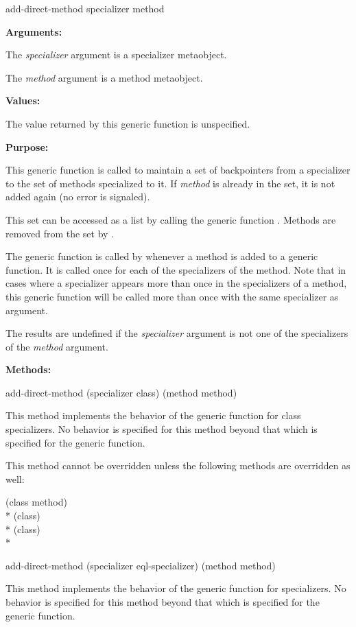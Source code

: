 \begin{defun}
add-direct-method specializer method

\textbf{Arguments:}

The \emph{specializer} argument is a specializer metaobject.

The \emph{method} argument is a method metaobject.

\textbf{Values:}

The value returned by this generic function is unspecified.

\textbf{Purpose:}

This generic function is called to maintain a set of backpointers from a
specializer to the set of methods specialized to it. If \emph{method} is already in the
set, it is not added again (no error is signaled).

This set can be accessed as a list by calling the generic function
. Methods are removed from the set by
.

The generic function  is called by  whenever a method
is added to a generic function. It is called once for each of the specializers
of the method. Note that in cases where a specializer appears more than once in
the specializers of a method, this generic function will be called more than
once with the same specializer as argument. 

The results are undefined if the \emph{specializer} argument is not one of the
specializers of the \emph{method} argument.

\textbf{Methods:}

\begin{defun}
add-direct-method (specializer class) (method method)

This method implements the behavior of the generic function for class
specializers. No behavior is specified for this method beyond that which is
specified for the generic function.

This method cannot be overridden unless the following methods are overridden as well:

\begin{tabbing}
     (class method)\\*
     (class)\\*
     (class) \\*
\end{tabbing}
  
\end{defun}
  
\begin{defun}
add-direct-method (specializer eql-specializer) (method method)

This method implements the behavior of the generic function for 
specializers. No behavior is specified for this method beyond that which is
specified for the generic function.
\end{defun}

\end{defun}

